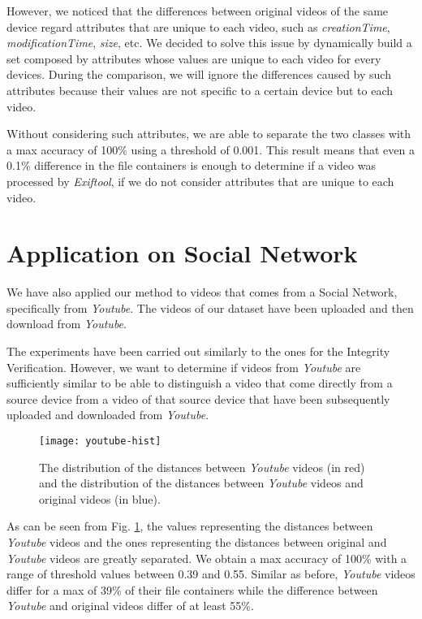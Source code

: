 However, we noticed that the differences between original videos of the same device regard attributes that are unique to each video, such as \emph{creationTime}, \emph{modificationTime}, \emph{size}, etc. We decided to solve this issue by dynamically build a set composed by attributes whose values are unique to each video for every devices. During the comparison, we will ignore the differences caused by such attributes because their values are not specific to a certain device but to each video.

Without considering such attributes, we are able to separate the two classes with a max accuracy of 100\% using a threshold of 0.001. This result means that even a 0.1\% difference in the file containers is enough to determine if a video was processed by \emph{Exiftool}, if we do not consider attributes that are unique to each video.

\section{Application on Social Network}

We have also applied our method to videos that comes from a Social Network, specifically from \emph{Youtube}. The videos of our dataset have been uploaded and then download from \emph{Youtube}.

The experiments have been carried out similarly to the ones for the Integrity Verification. However, we want to determine if videos from \emph{Youtube} are sufficiently similar to be able to distinguish a video that come directly from a source device from a video of that source device that have been subsequently uploaded and downloaded from \emph{Youtube}.

\begin{figure}
  \centering
  \texttt{[image: youtube-hist]}
  \caption{The distribution of the distances between \emph{Youtube} videos (in red) and the distribution of the distances between \emph{Youtube} videos and original videos (in blue).}\label{fig:youtube-hist}
\end{figure}

As can be seen from Fig. \ref{fig:youtube-hist}, the values representing the distances between \emph{Youtube} videos and the ones representing the distances between original and \emph{Youtube} videos are greatly separated. We obtain a max accuracy of 100\% with a range of threshold values between 0.39 and 0.55. Similar as before, \emph{Youtube} videos differ for a max of 39\% of their file containers while the difference between \emph{Youtube} and original videos differ of at least 55\%.

